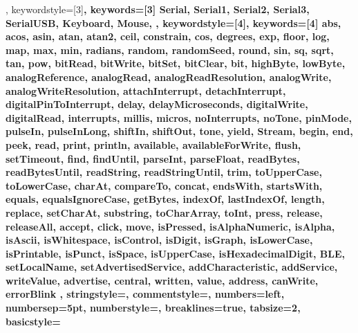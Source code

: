 {{                },  
% 
%
  keywordstyle=[3]\bfseries\color{arduinoOrange},
  keywords=[3]{  %
                Serial, Serial1, Serial2, Serial3, SerialUSB, Keyboard, Mouse,
                },      
%
%
  keywordstyle=[4]\color{arduinoOrange},
  keywords=[4]{  %
                abs, acos, asin, atan, atan2, ceil, constrain, cos, degrees, exp, 
                floor, log, map, max, min, radians, random, randomSeed, round, sin, 
                sq, sqrt, tan, pow, bitRead, bitWrite, bitSet, bitClear, bit, 
                highByte, lowByte, analogReference, analogRead, 
                analogReadResolution, analogWrite, analogWriteResolution, 
                attachInterrupt, detachInterrupt, digitalPinToInterrupt, delay, 
                delayMicroseconds, digitalWrite, digitalRead, interrupts, millis, 
                micros, noInterrupts, noTone, pinMode, pulseIn, pulseInLong, shiftIn, 
                shiftOut, tone, yield, Stream, begin, end, peek, read, print, 
                println, available, availableForWrite, flush, setTimeout, find, 
                findUntil, parseInt, parseFloat, readBytes, readBytesUntil, readString, 
                readStringUntil, trim, toUpperCase, toLowerCase, charAt, compareTo, 
                concat, endsWith, startsWith, equals, equalsIgnoreCase, getBytes, 
                indexOf, lastIndexOf, length, replace, setCharAt, substring, 
                toCharArray, toInt, press, release, releaseAll, accept, click, move, 
                isPressed, isAlphaNumeric, isAlpha, isAscii, isWhitespace, isControl, 
                isDigit, isGraph, isLowerCase, isPrintable, isPunct, isSpace, 
                isUpperCase, isHexadecimalDigit, BLE, setLocalName, setAdvertisedService, addCharacteristic, addService, writeValue, advertise, central, written, value, address, canWrite, errorBlink
                },      
%
%
  stringstyle=\color{arduinoDarkBlue},    
  commentstyle=\color{arduinoGrey},    
%          
%   
  numbers=left,                    
  numbersep=5pt,                   
  numberstyle=\color{arduinoGrey},    
%
%
  breaklines=true,                    %
  tabsize=2,         
  basicstyle=\ttfamily  
}
